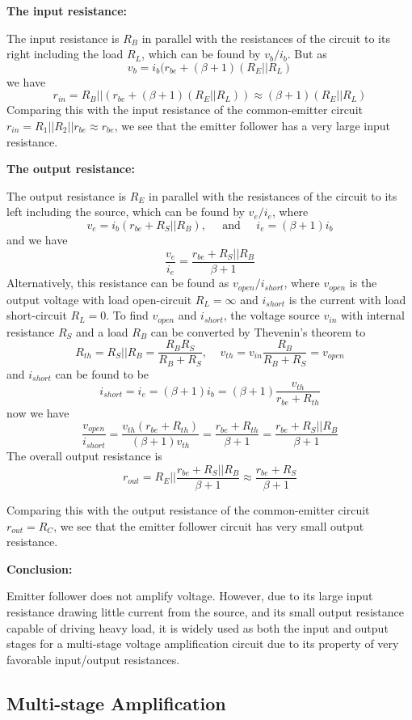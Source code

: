 {\bf The input resistance:} 

The input resistance is $R_B$ in parallel with the resistances of the circuit
to its right including the load $R_L$, which can be found by $v_b/i_b$. But as
\[ v_b=i_b(r_{be}+(\beta+1)(R_E||R_L) \]
we have
\[ r_{in}=R_B || (r_{be}+(\beta+1) (R_E||R_L) )\approx (\beta+1)(R_E||R_L) \]
Comparing this with the input resistance of the common-emitter circuit
$r_{in}=R_1||R_2|| r_{be} \approx r_{be}$, we see that the emitter
follower has a very large input resistance.

{\bf The output resistance:}

The output resistance is $R_E$ in parallel with the resistances of the circuit
to its left including the source, which can be found by $v_e/i_e$, where
\[ v_e=i_b(r_{be}+R_S||R_B), \;\;\;\;\;\mbox{and}\;\;\;\;\; i_e=(\beta+1)i_b\]
and we have
\[	\frac{v_e}{i_e}=\frac{r_{be}+R_S||R_B}{\beta+1}	\]
Alternatively, this resistance can be found as $v_{open}/i_{short}$, where 
$v_{open}$ is the output voltage with load open-circuit $R_L=\infty$ and
$i_{short}$ is the current with load short-circuit $R_L=0$. To find $v_{open}$
and $i_{short}$, the voltage source $v_{in}$ with internal resistance $R_S$ 
and a load $R_B$ can be converted by Thevenin's theorem to 
\[ R_{th}=R_S||R_B=\frac{R_B R_S}{R_B+R_S},	\;\;\;\;
	v_{th}=v_{in} \frac{R_B}{R_B+R_S}=v_{open}	\]
and $i_{short}$ can be found to be
\[	i_{short}=i_e=(\beta+1)i_b=(\beta+1)\frac{v_{th}}{r_{be}+R_{th}} \]
now we have
\[ \frac{v_{open}}{i_{short}}=\frac{v_{th}(r_{be}+R_{th})}{(\beta+1) v_{th}}
	=\frac{r_{be}+R_{th}}{\beta+1} =\frac{r_{be}+R_S||R_B}{\beta+1} \]
The overall output resistance is
\[	r_{out}	= R_E || \frac{r_{be}+R_S||R_B}{\beta+1}	
	\approx \frac{r_{be}+R_S}{\beta+1}	\]


Comparing this with the output resistance of the common-emitter circuit
$r_{out}=R_C$, we see that the emitter follower circuit has very small
output resistance.

{\bf Conclusion:} 

Emitter follower does not amplify voltage. However, due to its large input 
resistance drawing little current from the source, and its small output 
resistance capable of driving heavy load, it is widely used as both the 
input and output stages for a multi-stage voltage amplification circuit 
due to its property of very favorable input/output resistances.

\subsection*{Multi-stage Amplification}

